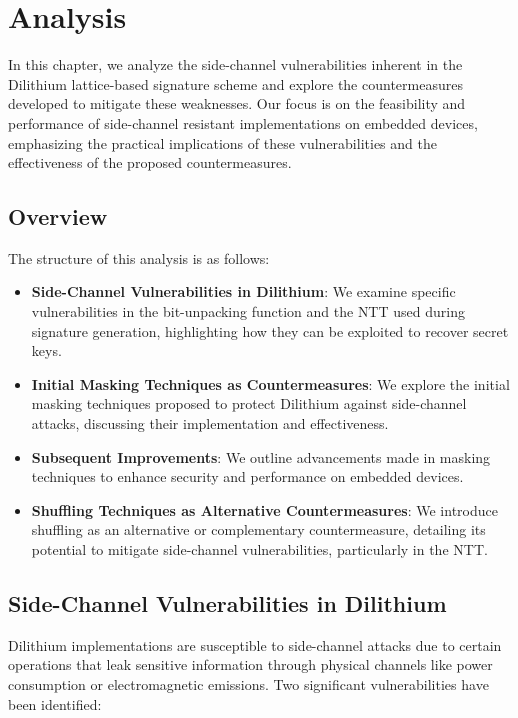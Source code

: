 \chapter{Analysis}
\thispagestyle{chapterstart}

In this chapter, we analyze the side-channel vulnerabilities inherent in the Dilithium lattice-based signature scheme and explore the countermeasures developed to mitigate these weaknesses. Our focus is on the feasibility and performance of side-channel resistant implementations on embedded devices, emphasizing the practical implications of these vulnerabilities and the effectiveness of the proposed countermeasures.

\section{Overview}

The structure of this analysis is as follows:

\begin{itemize}
    \item \textbf{Side-Channel Vulnerabilities in Dilithium}: We examine specific vulnerabilities in the bit-unpacking function and the \ac{NTT} used during signature generation, highlighting how they can be exploited to recover secret keys.
    \item \textbf{Initial Masking Techniques as Countermeasures}: We explore the initial masking techniques proposed to protect Dilithium against side-channel attacks, discussing their implementation and effectiveness.
    \item \textbf{Subsequent Improvements}: We outline advancements made in masking techniques to enhance security and performance on embedded devices.
    \item \textbf{Shuffling Techniques as Alternative Countermeasures}: We introduce shuffling as an alternative or complementary countermeasure, detailing its potential to mitigate side-channel vulnerabilities, particularly in the \ac{NTT}.
\end{itemize}

\section{Side-Channel Vulnerabilities in Dilithium}

Dilithium implementations are susceptible to side-channel attacks due to certain operations that leak sensitive information through physical channels like power consumption or electromagnetic emissions. Two significant vulnerabilities have been identified:

